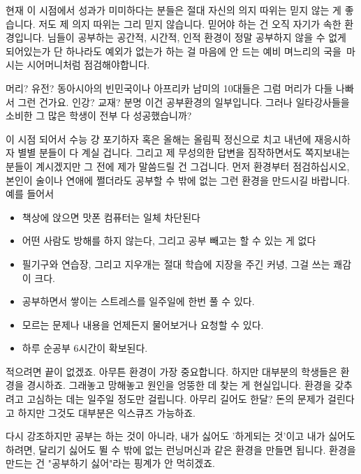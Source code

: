 현재 이 시점에서 성과가 미미하다는 분들은 절대 자신의 의지 따위는 믿지 않는 게 좋습니다.
저도 제 의지 따위는 그리 믿지 않습니다.
믿어야 하는 건 오직 자기가 속한 환경입니다.
님들이 공부하는 공간적, 시간적, 인적 환경이 정말 공부하지 않을 수 없게 되어있는가
단 하나라도 예외가 없는가 하는 걸 마음에 안 드는 예비 며느리의 국을 마시는 시어머니처럼 점검해야합니다.
\vspace{5mm}

머리? 유전?
동아시아의 빈민국이나 아프리카 남미의 10대들은 그럼 머리가 다들 나빠서 그런 건가요.
인강? 교재?
분명 이건 공부환경의 일부입니다. 그러나 일타강사들을 소비한 그 많은 학생이 전부 다 성공했습니까?
\vspace{5mm}

이 시점 되어서 수능 걍 포기하자 혹은 올해는 올림픽 정신으로 치고 내년에 재응시하자 별별 분들이 다 계실 겁니다.
그리고 제 무성의한 답변을 짐작하면서도 쪽지보내는 분들이 계시겠지만 그 전에 제가 말씀드릴 건 그겁니다.
먼저 환경부터 점검하십시오, 본인이 술이나 연애에 쩔더라도 공부할 수 밖에 없는 그런 환경을 만드시길 바랍니다.
예를 들어서
\vspace{5mm}

\begin{itemize}
    \item 책상에 앉으면 맛폰 컴퓨터는 일체 차단된다
    \item 어떤 사람도 방해를 하지 않는다, 그리고 공부 빼고는 할 수 있는 게 없다
    \item 필기구와 연습장, 그리고 지우개는 절대 학습에 지장을 주긴 커녕, 그걸 쓰는 쾌감이 크다.
    \item 공부하면서 쌓이는 스트레스를 일주일에 한번 풀 수 있다.
    \item 모르는 문제나 내용을 언제든지 물어보거나 요청할 수 있다.
    \item 하루 순공부 6시간이 확보된다.
\end{itemize}
\vspace{5mm}

적으려면 끝이 없겠죠. 아무튼 환경이 가장 중요합니다.
하지만 대부분의 학생들은 환경을 경시하죠. 그래놓고 망해놓고 원인을 엉뚱한 데 찾는 게 현실입니다.
환경을 갖추려고 고심하는 데는 일주일 정도만 걸립니다. 아무리 길어도 한달?
돈의 문제가 걸린다고 하지만 그것도 대부분은 익스큐즈 가능하죠.
\vspace{5mm}

다시 강조하지만 공부는 하는 것이 아니라, 내가 싫어도 '하게되는 것'이고
내가 싫어도 하려면, 달리기 싫어도 뛸 수 밖에 없는 런닝머신과 같은 환경을 만들면 됩니다.
환경을 만드는 건 "공부하기 싫어"라는 핑계가 안 먹히겠죠.
\vspace{5mm}






